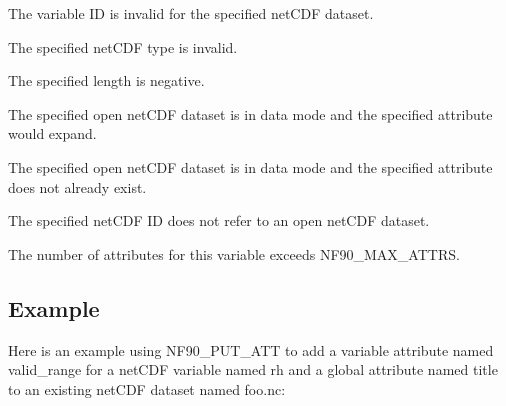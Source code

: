 \begin{DoxyItemize}
\item The variable ID is invalid for the specified net\+C\+DF dataset.
\item The specified net\+C\+DF type is invalid.
\item The specified length is negative.
\item The specified open net\+C\+DF dataset is in data mode and the specified attribute would expand.
\item The specified open net\+C\+DF dataset is in data mode and the specified attribute does not already exist.
\item The specified net\+C\+DF ID does not refer to an open net\+C\+DF dataset.
\item The number of attributes for this variable exceeds N\+F90\+\_\+\+M\+A\+X\+\_\+\+A\+T\+T\+RS.
\end{DoxyItemize}

\subsection*{Example}

Here is an example using N\+F90\+\_\+\+P\+U\+T\+\_\+\+A\+TT to add a variable attribute named valid\+\_\+range for a net\+C\+DF variable named rh and a global attribute named title to an existing net\+C\+DF dataset named foo.\+nc\+:


